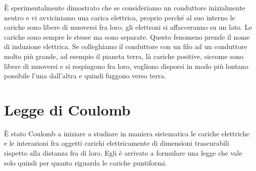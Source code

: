 È sperimentalmente dimostrato che se consideriamo un conduttore inizialmente neutro e vi avviciniamo una carica elettrica, proprio perché al suo interno le cariche sono libere di muoversi fra loro, gli elettroni si affacceranno su un lato. Le cariche sono sempre le stesse ma sono separate. Questo fenomeno prende il nome di induzione elettrica. Se colleghiamo il conduttore con un filo ad un conduttore molto più grande, ad esempio il pianeta terra, là cariche positive, siccome sono libere di muoversi e si respingono fra loro, vogliono disporsi in modo più lontano possibile l'una dall'altra e quindi fuggono verso terra.

\section{Legge di Coulomb}

È stato Coulomb a iniziare a studiare in maniera sistematica le cariche elettriche e le interazioni fra oggetti carichi elettricamente di dimensioni trascurabili rispetto alla distanza fra di loro. Egli è arrivato a formulare una legge che vale solo quindi per quanto riguarda le cariche puntiformi.

